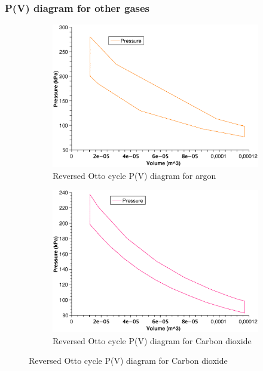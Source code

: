 \documentclass{scrartcl}
\begin{document}
\subsubsection{P(V) diagram for other gases}
\begin{figure}[!ht]
     \centering
     \begin{subfigure}[b]{0.3\textwidth}
         \centering
         \includegraphics[width=\textwidth]{Otto/PV_argon_O.eps}
         \caption{Reversed Otto cycle P(V) diagram for argon}
         \label{fig:Otto_argon}
     \end{subfigure}
     \hfill
     \begin{subfigure}[b]{0.3\textwidth}
         \centering
         \includegraphics[width=\textwidth]{Otto/PV_CO2_Otto.eps}
         \caption{Reversed Otto cycle P(V) diagram for Carbon dioxide}
         \label{fig:Otto_CO2}

\end{subfigure}
\end{figure}
\end{document}
